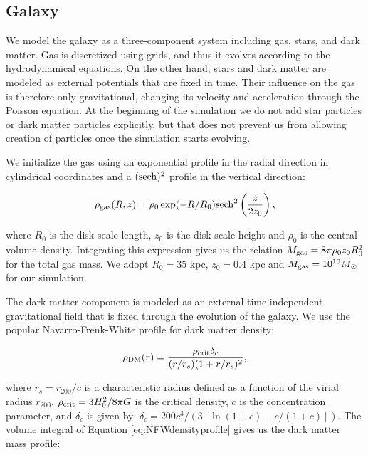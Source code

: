 \documentclass[twocolumn]{aastex}
\newcommand{\msun}{M_\odot}
\newcommand{\rhogas}{\rho_{\rm gas}}
\newcommand{\rhoo}{\rho_0}
\newcommand{\zo}{z_0}
\newcommand{\Ro}{R_0}
\newcommand{\mgas}{M_{\rm gas}}
\newcommand{\roo}{r_{200}}
\begin{document}
\subsection{Galaxy}
\label{subsec:galaxy}

We model the galaxy as a three-component system including gas, stars, and dark matter. Gas is discretized using grids, and thus it evolves according to the hydrodynamical equations. On the other hand, stars and dark matter are modeled as external potentials that are fixed in time. Their influence on the gas is therefore only gravitational, changing its velocity and acceleration through the Poisson equation. At the beginning of the simulation we do not add star particles or dark matter particles explicitly, but that does not prevent us from allowing creation of particles once the simulation starts evolving.

We initialize the gas using an exponential profile in the radial direction in cylindrical coordinates and a $({\rm sech})^2$ profile in the vertical direction:

	\begin{equation}
	\rhogas(R,z)=\rho_0 \exp(-R/\Ro) \mathrm{sech}^2\left(\frac{z}{2z_0}\right),
	\label{eq:exponentialprofile}
	\end{equation}

\noindent where $\Ro$ is the disk scale-length, $\zo$ is the disk scale-height and $\rho_0$ is the central volume density. Integrating this expression gives us the relation $\mgas=8\pi \rhoo \zo \Ro^2$ for the total gas mass. We adopt $\Ro=35$ kpc, $\zo=0.4$ kpc and $\mgas=10^{10} \msun$ for our simulation.

The dark matter component is modeled as an external time-independent gravitational field that is fixed through the evolution of the galaxy. We use the popular Navarro-Frenk-White profile \citep[NFW,][]{NFW97} for dark matter density:

	\begin{equation}
	\rho_{\rm DM} (r)=\frac{\rho_{\rm crit} \delta_c}{(r/r_s)(1+r/r_s)^2},
	\label{eq:NFWdensityprofile}
	\end{equation}

\noindent where $r_s=\roo/c$ is a characteristic radius defined as a function of the virial radius $\roo$, $\rho_{\rm crit}=3H_0^2/8\pi G$ is the critical density, $c$ is the concentration parameter, and $\delta_c$ is given by: $\delta_c=200c^3/(3[\ln(1+c)-c/(1+c)])$. The volume integral of Equation \ref{eq:NFWdensityprofile} gives us the dark matter mass profile:
\end{document}
